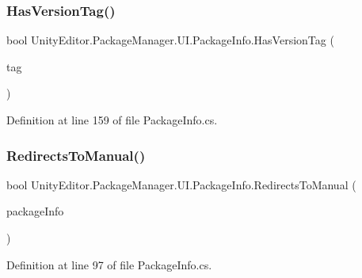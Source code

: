 \mbox{\label{class_unity_editor_1_1_package_manager_1_1_u_i_1_1_package_info_a8c8d27185f47ae2a1d201d9072737f81}} 
\subsubsection{\texorpdfstring{HasVersionTag()}{HasVersionTag()}\hspace{0.1cm}{\footnotesize\ttfamily [2/2]}}
{\footnotesize\ttfamily bool Unity\+Editor.\+Package\+Manager.\+U\+I.\+Package\+Info.\+Has\+Version\+Tag (\begin{DoxyParamCaption}\item[{\mbox{\hyperlink{namespace_unity_editor_1_1_package_manager_1_1_u_i_afd939208534e3c178925b2f726ab9efe}{Package\+Tag}}}]{tag }\end{DoxyParamCaption})}



Definition at line 159 of file Package\+Info.\+cs.

\mbox{\label{class_unity_editor_1_1_package_manager_1_1_u_i_1_1_package_info_a03d825c68ddab1ff6f9e0244bca21a6a}} 
\subsubsection{\texorpdfstring{RedirectsToManual()}{RedirectsToManual()}}
{\footnotesize\ttfamily bool Unity\+Editor.\+Package\+Manager.\+U\+I.\+Package\+Info.\+Redirects\+To\+Manual (\begin{DoxyParamCaption}\item[{\mbox{\hyperlink{class_unity_editor_1_1_package_manager_1_1_u_i_1_1_package_info}{Package\+Info}}}]{package\+Info }\end{DoxyParamCaption})}



Definition at line 97 of file Package\+Info.\+cs.



